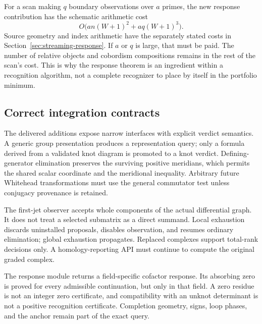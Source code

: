 For a scan making $q$ boundary observations over $a$ primes, the new
response contribution has the schematic arithmetic cost
\[
 O\bigl(a n(W+1)^2+a q(W+1)^3\bigr).
\]
Source geometry and index arithmetic have the separately stated costs
in Section~\ref{sec:streaming-response}. If $a$ or $q$ is large, that
must be paid. The number of relative objects and cobordism compositions
remains in the rest of the scan's cost. This is why the response theorem
is an ingredient within a recognition algorithm, not a complete
recognizer to place by itself in the portfolio minimum.

\subsection{Correct integration contracts}

The delivered additions expose narrow interfaces with explicit verdict
semantics. A generic group presentation produces a representation query;
only a formula derived from a validated knot diagram is promoted to a
knot verdict. Defining-generator elimination preserves the surviving
positive meridians, which permits the shared scalar coordinate and the
meridional inequality. Arbitrary future Whitehead transformations must
use the general commutator test unless conjugacy provenance is retained.

The first-jet observer accepts whole components of the actual differential
graph. It does not treat a selected submatrix as a direct summand. Local
exhaustion discards uninstalled proposals, disables observation, and resumes
ordinary elimination; global exhaustion propagates. Replaced complexes
support total-rank decisions only. A homology-reporting API must continue
to compute the original graded complex.

The response module returns a field-specific cofactor response. Its
absorbing zero is proved for every admissible continuation, but only in
that field. A zero residue is not an integer zero certificate, and
compatibility with an unknot determinant is not a positive recognition
certificate. Completion geometry, signs, loop phases, and the anchor
remain part of the exact query.

